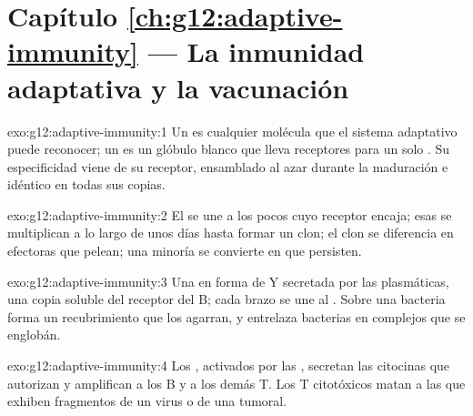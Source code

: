 \section*{Capítulo \ref{ch:g12:adaptive-immunity} --- La inmunidad adaptativa y la vacunación}

\begin{solution}{exo:g12:adaptive-immunity:1}
Un  es cualquier molécula que el sistema adaptativo puede
reconocer; un  es un glóbulo blanco que lleva receptores para
un solo . Su especificidad viene de su receptor, ensamblado al
azar durante la maduración e idéntico en todas sus copias.
\end{solution}

\begin{solution}{exo:g12:adaptive-immunity:2}
El  se une a los pocos  cuyo receptor encaja; esas
 se multiplican a lo largo de unos días hasta formar un clon; el
clon se diferencia en  efectoras que pelean; una minoría se
convierte en  que persisten.
\end{solution}

\begin{solution}{exo:g12:adaptive-immunity:3}
Una  en forma de Y secretada por las  plasmáticas, una
copia soluble del receptor del  B; cada brazo se une al
. Sobre una bacteria forma un recubrimiento que los 
agarran, y entrelaza bacterias en complejos que se englobán.
\end{solution}

\begin{solution}{exo:g12:adaptive-immunity:4}
Los , activados por las ,
secretan las citocinas que autorizan y amplifican a los  B y
a los demás  T. Los T citotóxicos matan a las  que
exhiben fragmentos de un virus o de una  tumoral.
\end{solution}

